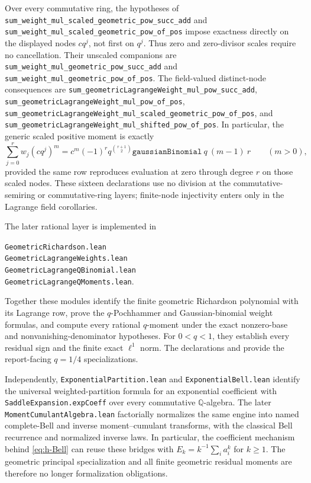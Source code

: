 \documentclass[11pt]{article}
\theoremstyle{definition}
\theoremstyle{remark}
\begin{document}
Over every commutative ring, the hypotheses of
\nolinkurl{sum_weight_mul_scaled_geometric_pow_succ_add} and
\nolinkurl{sum_weight_mul_scaled_geometric_pow_of_pos} impose exactness
directly on the displayed nodes \(c q^j\), not first on \(q^j\).  Thus zero
and zero-divisor scales require no cancellation.  Their unscaled companions
are \nolinkurl{sum_weight_mul_geometric_pow_succ_add} and
\nolinkurl{sum_weight_mul_geometric_pow_of_pos}.  The field-valued
distinct-node consequences are
\nolinkurl{sum_geometricLagrangeWeight_mul_pow_succ_add},
\nolinkurl{sum_geometricLagrangeWeight_mul_pow_of_pos},
\nolinkurl{sum_geometricLagrangeWeight_mul_scaled_geometric_pow_of_pos}, and
\nolinkurl{sum_geometricLagrangeWeight_mul_shifted_pow_of_pos}.  In particular,
the generic scaled positive moment is exactly
\[
 \sum_{j=0}^{r}w_j(cq^j)^m
 =c^m(-1)^r q^{\binom{r+1}{2}}
   \texttt{gaussianBinomial}\ q\ (m-1)\ r
 \qquad(m>0),
\]
provided the same row reproduces evaluation at zero through degree \(r\) on
those scaled nodes.  These sixteen declarations use no division at the
commutative-semiring or commutative-ring layers; finite-node injectivity enters
only in the Lagrange field corollaries.

The later rational layer is implemented in
\begin{center}
\texttt{GeometricRichardson.lean}\\
\texttt{GeometricLagrangeWeights.lean}\\
\texttt{GeometricLagrangeQBinomial.lean}\\
\texttt{GeometricLagrangeQMoments.lean}.
\end{center}
Together these modules identify the finite geometric Richardson polynomial
with its Lagrange row, prove the \(q\)-Pochhammer and Gaussian-binomial weight
formulas, and compute every rational \(q\)-moment
under the exact nonzero-base and nonvanishing-denominator hypotheses.  For
\(0<q<1\), they establish every residual sign and the finite exact
\(\ell^1\) norm.  The declarations
 and
 provide
the report-facing \(q=1/4\) specializations.

Independently,
\texttt{ExponentialPartition.lean} and
\texttt{ExponentialBell.lean} identify the universal weighted-partition
formula for an exponential coefficient with
\texttt{SaddleExpansion.expCoeff} over every commutative
\(\mathbb Q\)-algebra.  The later \texttt{MomentCumulantAlgebra.lean}
factorially normalizes the same engine into named complete-Bell and inverse
moment--cumulant transforms, with the classical Bell recurrence and
normalized inverse laws.  In particular, the coefficient mechanism behind
\eqref{eq:h-Bell} can reuse these bridges with
\(E_k=k^{-1}\sum_i a_i^k\) for \(k\ge1\).  The geometric principal
specialization and all finite geometric residual moments are therefore no
longer formalization obligations.
\end{document}
